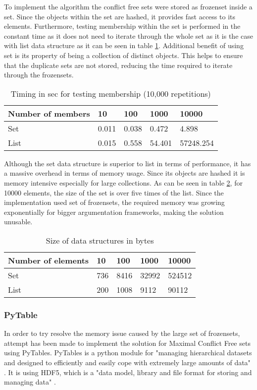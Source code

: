 To implement the algorithm the conflict free sets were stored as frozenset inside a set. Since the objects within the set are hashed, it provides fast access to its elements. Furthermore, testing membership within the set is performed in the constant time as it does not need to iterate through the whole set as it is the case with list data structure as it can be seen in table \ref{table:timingsMembership}. Additional benefit of using set is its property of being a collection of distinct objects. This helps to ensure that the duplicate sets are not stored, reducing the time required to iterate through the frozensets.

\begin{table}[h]
	\centering
	\caption{Timing in sec for testing membership (10,000 repetitions)}
	\label{table:timingsMembership}
	\begin{tabular}{lllll}
		\hline
		Number of members & 10    & 100   & 1000   & 10000 \\ \hline
		Set                & 0.011 & 0.038 & 0.472  & 4.898 \\
		List               & 0.015 & 0.558 & 54.401 & 57248.254 \\     
	\end{tabular}
\end{table}

Although the set data structure is superior to list in terms of performance, it has a massive overhead in terms of memory usage. Since its objects are hashed it is memory intensive especially for large collections. As can be seen in table \ref{table:sizeDataStructures}, for 10000 elements, the size of the set is over five times of the list. Since the implementation used set of frozensets, the required memory was growing exponentially for bigger argumentation frameworks, making the solution unusable.

\begin{table}[h]	
	\centering
	\caption{Size of data structures in bytes}
	\label{table:sizeDataStructures}
	\begin{tabular}{lllll}
		\hline
		Number of elements & 10  & 100  & 1000  & 10000  \\ \hline
		Set                & 736 & 8416 & 32992 & 524512 \\
		List               & 200 & 1008 & 9112  & 90112 
	\end{tabular}
\end{table}


\subsubsection{PyTable}
In order to try resolve the memory issue caused by the large set of frozensets, attempt has been made to implement the solution for Maximal Conflict Free sets using PyTables. PyTables is a python module for "managing hierarchical datasets and designed to efficiently and easily cope with extremely large amounts of data" \citep{pytables}. It is using HDF5, which is a "data model, library and file format for storing and managing data" \citep{hdf5}. 

